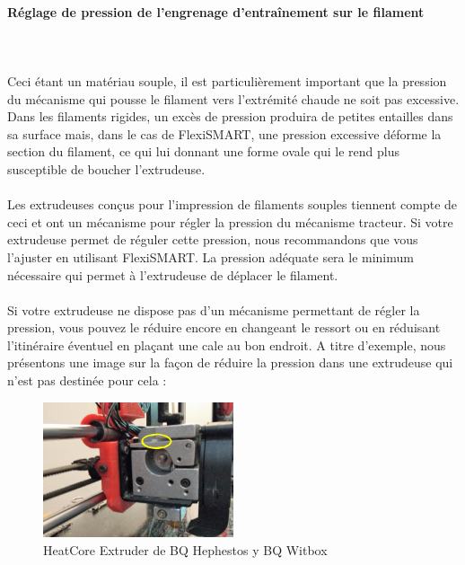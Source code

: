 \documentclass[11pt,a4paper]{article}
\begin{document}
	\paragraph{Réglage de pression de l’engrenage d’entraînement sur le filament}\mbox{}\\\\
Ceci étant un matériau souple, il est particulièrement important que la pression du mécanisme qui pousse le filament vers l'extrémité chaude ne soit pas excessive. Dans les filaments rigides, un excès de pression produira de petites entailles dans sa surface mais, dans le cas de FlexiSMART, une pression excessive déforme la section du filament, ce qui lui donnant une forme ovale qui le rend plus susceptible de boucher l'extrudeuse.
\\\\
Les extrudeuses conçus pour l’impression de filaments souples tiennent compte de ceci et ont un mécanisme pour régler la pression du mécanisme tracteur. Si votre extrudeuse permet de réguler cette pression, nous recommandons que vous l’ajuster en utilisant FlexiSMART. La pression adéquate sera le minimum nécessaire qui permet à l’extrudeuse de déplacer le filament.
\\\\
Si votre extrudeuse ne dispose pas d’un mécanisme permettant de régler la pression, vous pouvez le réduire encore en changeant le ressort ou en réduisant l’itinéraire éventuel en plaçant une cale au bon endroit. A titre d’exemple, nous présentons une image sur la façon de réduire la pression dans une extrudeuse qui n’est pas destinée pour cela :
\begin{figure}[H]
\centering
\includegraphics[width=0.5\textwidth,cfbox=azul_marcos 4pt 0pt]{FOTOS/SOLUCION1}
\caption*{HeatCore Extruder de BQ Hephestos y BQ Witbox}
\end{figure}
\end{document}
